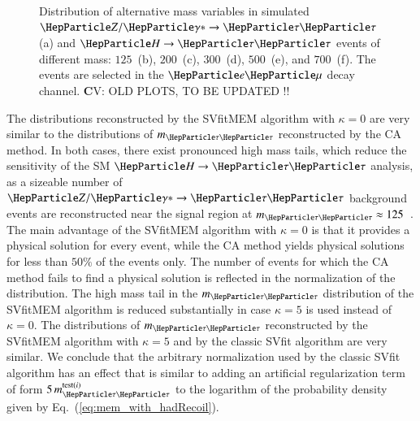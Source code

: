 \begin{figure}
\begin{center}
\end{center}
\caption{
  Distribution of alternative mass variables in simulated $\PZ/\Pggx
  \to \Pgt\Pgt$ (a) and $\PHiggs \to \Pgt\Pgt$ events of different mass:
  $125$~\GeV (b), $200$~\GeV (c), $300$~\GeV (d), $500$~\GeV (e), and
  $700$~\GeV (f).
  The events are selected in the $\Pe\Pgm$ decay channel.
  {\textbf CV: OLD PLOTS, TO BE UPDATED !!}
}
\label{fig:massDistributions_emu}
\end{figure}

The distributions reconstructed by the SVfitMEM algorithm with $\kappa = 0$ are very similar to the distributions of $m_{\Pgt\Pgt}$ reconstructed by the CA method.
In both cases, there exist pronounced high mass tails, which reduce the sensitivity of the SM $\PHiggs \to \Pgt\Pgt$ analysis,
as a sizeable number of $\PZ/\Pggx \to \Pgt\Pgt$ background events
are reconstructed near the signal region at $m_{\Pgt\Pgt} \approx 125$~\GeV.
The main advantage of the SVfitMEM algorithm with $\kappa =
0$ is that it provides a physical solution for every event,
while the CA method yields physical solutions for less than $50\%$ of
the events only.
The number of events for which the CA method fails to find a physical solution is reflected in the normalization of the distribution.
The high mass tail in the $m_{\Pgt\Pgt}$ distribution of
the SVfitMEM algorithm is reduced substantially in case
$\kappa = 5$ is used instead of $\kappa = 0$.
The distributions of $m_{\Pgt\Pgt}$ reconstructed by the SVfitMEM
algorithm with $\kappa = 5$ and by the classic SVfit algorithm are
very similar.
We conclude that the arbitrary normalization used by the classic SVfit
algorithm has an effect that is similar to adding 
an artificial regularization term of form $5 \,
m_{\Pgt\Pgt}^{\textrm{test}(i)}$ to the logarithm of the probability
density given by Eq.~(\ref{eq:mem_with_hadRecoil}).

